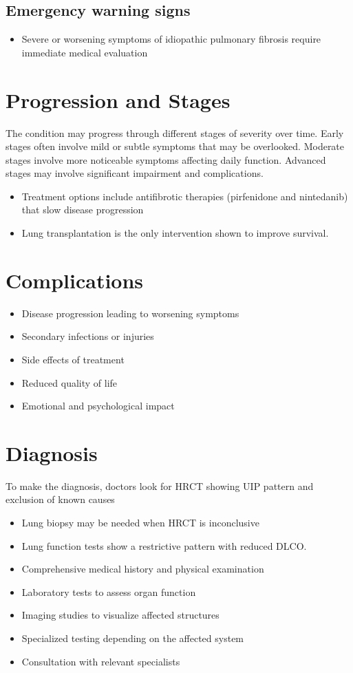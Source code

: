 \subsection{Emergency warning signs}
\begin{itemize}[noitemsep]
  \item Severe or worsening symptoms of idiopathic pulmonary fibrosis require immediate medical evaluation
\end{itemize}
\section{Progression and Stages}
The condition may progress through different stages of severity over time. Early stages often involve mild or subtle symptoms that may be overlooked. Moderate stages involve more noticeable symptoms affecting daily function. Advanced stages may involve significant impairment and complications.

\begin{itemize}[noitemsep]
  \item Treatment options include antifibrotic therapies (pirfenidone and nintedanib) that slow disease progression
  \item Lung transplantation is the only intervention shown to improve survival.
\end{itemize}
\section{Complications}
\begin{itemize}[noitemsep]
  \item Disease progression leading to worsening symptoms
  \item Secondary infections or injuries
  \item Side effects of treatment
  \item Reduced quality of life
  \item Emotional and psychological impact
\end{itemize}
\section{Diagnosis}
To make the diagnosis, doctors look for HRCT showing UIP pattern and exclusion of known causes

\begin{itemize}[noitemsep]
  \item Lung biopsy may be needed when HRCT is inconclusive
  \item Lung function tests show a restrictive pattern with reduced DLCO.
  \item Comprehensive medical history and physical examination
  \item Laboratory tests to assess organ function
  \item Imaging studies to visualize affected structures
  \item Specialized testing depending on the affected system
  \item Consultation with relevant specialists
\end{itemize}
